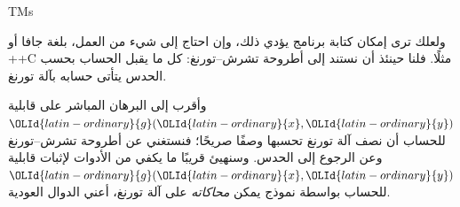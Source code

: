 \documentclass[../../../include/open-logic-section]{subfiles}
\begin{document}
\begin{tagblock}{TMs}
\begin{digress}
ولعلك ترى إمكان كتابة برنامج يؤدي ذلك، وإن احتاج إلى شيء من العمل،
بلغة جافا أو ++C مثلًا. فلنا حينئذ أن نستند إلى أطروحة
تشرش--تورنغ: كل ما يقبل الحساب بحسب الحدس يتأتى
حسابه بآلة تورنغ.

وأقرب إلى البرهان المباشر على قابلية ${\OLId{latin-ordinary}{g}}({\OLId{latin-ordinary}{x}},{\OLId{latin-ordinary}{y}})$ للحساب أن نصف آلة
تورنغ تحسبها وصفًا صريحًا؛ فنستغني عن أطروحة تشرش--تورنغ
وعن الرجوع إلى الحدس. وسنهيئ قريبًا ما يكفي من الأدوات لإثبات
قابلية ${\OLId{latin-ordinary}{g}}({\OLId{latin-ordinary}{x}},{\OLId{latin-ordinary}{y}})$ للحساب بواسطة نموذج يمكن
\emph{محاكاته} على آلة تورنغ، أعني الدوال العودية.
\end{digress}
\end{tagblock}
\end{document}
